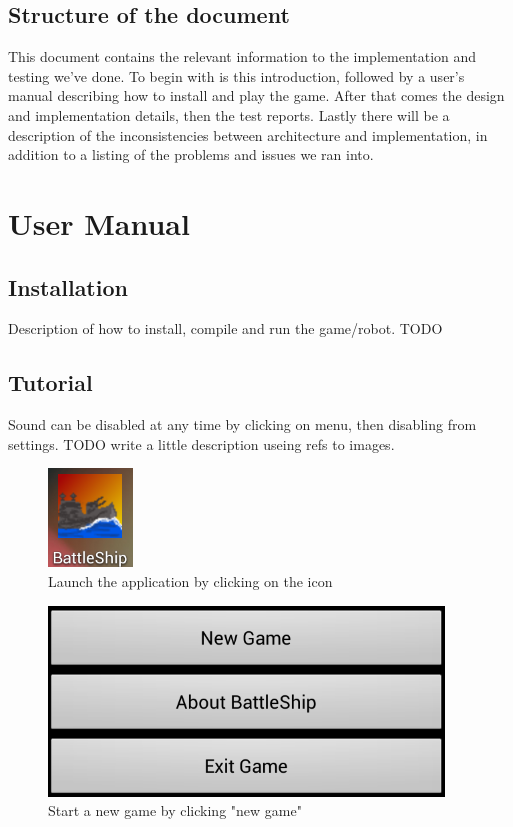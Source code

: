 \documentclass[12pt, a4paper]{article}
\begin{document}
\subsection{Structure of the document}
This document contains the relevant information to the implementation and
testing we’ve done. To begin with is this introduction, followed by a user’s
manual describing how to install and play the game. After that comes the design
and implementation details, then the test reports. Lastly there will be a
description of the inconsistencies between architecture and implementation, in
addition to a listing of the problems and issues we ran into.

\section{User Manual}
\subsection{Installation}
Description of how to install, compile and run the game/robot.
TODO 

\subsection{Tutorial}
Sound can be disabled at any time by clicking on menu, then disabling from
settings.
TODO write a little description useing refs to images. 

\begin{figure}[h!]
    \centering
    \includegraphics[width=.4\textwidth]{starticon} 
    \caption{Launch the application by clicking on the icon}
    \label{fig:starticon}
\end{figure}

\begin{figure}[h!]
    \centering
    \includegraphics[width=.6\textwidth]{newgame} 
    \caption{Start a new game by clicking "new game"}
    \label{fig:newgame}
\end{figure}
\end{document}
